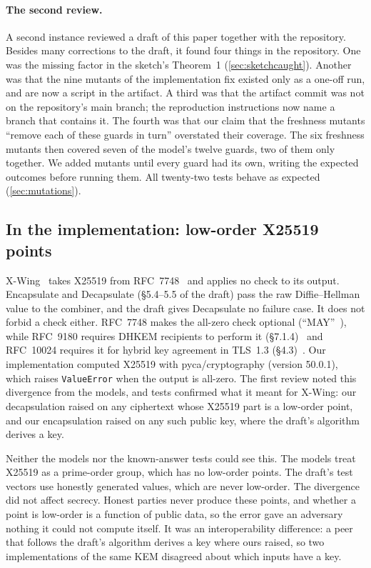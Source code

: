 \paragraph{The second review.} A second instance reviewed a draft of this
paper together with the repository. Besides many corrections to the draft,
it found four things in the repository. One was the missing factor in the
sketch's Theorem~1 (\cref{sec:sketchcaught}). Another was that the nine
mutants of the implementation fix existed only as a one-off run, and are now
a script in the artifact. A third was that the artifact commit was not on
the repository's main branch; the reproduction instructions now name a
branch that contains it. The fourth was that our claim that the
freshness mutants ``remove each of these guards in turn'' overstated their
coverage. The six freshness mutants then covered seven of the model's
twelve guards, two of them only together. We added mutants until every
guard had its own, writing the expected outcomes before running them. All
twenty-two tests behave as expected (\cref{sec:mutations}).

\subsection{In the implementation: low-order X25519 points}\label{sec:lowcaught}

X-Wing~\cite{XWingDraft} takes X25519 from RFC~7748~\cite[\S5]{RFC7748} and
applies no check to its output. Encapsulate and Decapsulate
(\S5.4--5.5 of the draft) pass the raw Diffie--Hellman value to the
combiner, and the draft gives Decapsulate no failure case. It does not
forbid a check either. RFC~7748 makes the all-zero check optional
(``MAY''~\cite[\S6.1]{RFC7748}), while RFC~9180 requires DHKEM recipients to
perform it (\S7.1.4)~\cite{RFC9180} and RFC~10024 requires it for hybrid key
agreement in TLS~1.3 (\S4.3)~\cite{RFC10024}. Our implementation computed
X25519 with pyca/cryptography (version 50.0.1), which raises
\texttt{ValueError} when the output is all-zero. The first review noted this
divergence from the models, and tests confirmed what it meant for X-Wing:
our decapsulation raised on any ciphertext whose X25519 part is a low-order
point, and our encapsulation raised on any such public key, where the
draft's algorithm derives a key.

Neither the models nor the known-answer tests could see this. The models
treat X25519 as a prime-order group, which has no low-order points. The
draft's test vectors use honestly generated values, which are never
low-order. The divergence did not affect secrecy. Honest parties never
produce these points, and whether a point is low-order is a function of
public data, so the error gave an adversary nothing it could not compute
itself. It was an interoperability difference: a peer that follows the
draft's algorithm derives a key where ours raised, so two implementations of
the same KEM disagreed about which inputs have a key.

